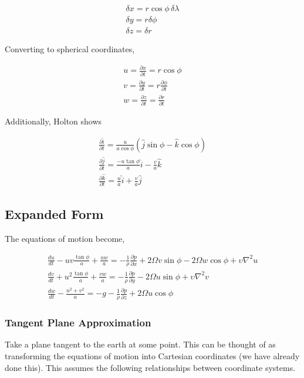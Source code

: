 \documentclass[a4paper,12pt]{article}
\begin{document}
\begin{align}
\delta x = r\cos\phi \, \delta \lambda \\
\delta y = r \delta \phi\\
\delta z = \delta r
\end{align}

Converting to spherical coordinates,

\begin{align}
u = \frac{\partial x}{\partial t} = r\cos\phi\\
v = \frac{\partial y}{\partial t} = r\frac{\partial \phi}{\partial t}\\
w = \frac{\partial z}{\partial t} = \frac{\partial r}{\partial t}
\end{align}

Additionally, Holton shows

\begin{align}
\frac{\partial \hat{i}}{\partial t} = \frac{u}{a\cos\phi}(\hat{j}\sin\phi - \hat{k}\cos\phi)\\
\frac{\partial \hat{j}}{\partial t} = \frac{-u\tan\phi}{a} \hat{i} - \frac{v}{a} \hat{k}\\
\frac{\partial \hat{k}}{\partial t} = \frac{u}{a} \hat{i} + \frac{v}{a} \hat{j}
\end{align}

\subsection*{Expanded Form}
The equations of motion become,

\begin{align}
\frac{du}{dt} - uv\frac{\tan\phi}{a} + \frac{uw}{a} = -\frac{1}{\rho} \frac{\partial p}{\partial x} + 2\Omega v\sin\phi - 2\Omega w\cos\phi + \upsilon\nabla^2 u\\
\frac{dv}{dt} + u^2\frac{\tan\phi}{a} + \frac{vw}{a} = -\frac{1}{\rho} \frac{\partial p}{\partial y} - 2\Omega u \sin\phi + \upsilon\nabla^2 v\\
\frac{dw}{dt} - \frac{u^2 + v^2}{a} = -g - \frac{1}{\rho}\frac{\partial p}{\partial z} + 2\Omega u \cos\phi
\end{align}

\subsubsection*{Tangent Plane Approximation}

Take a plane tangent to the earth at some point. This can be thought of as transforming the equations of motion into Cartesian coordinates (we have already done this). This assumes the following relationships between coordinate systems.
\end{document}
